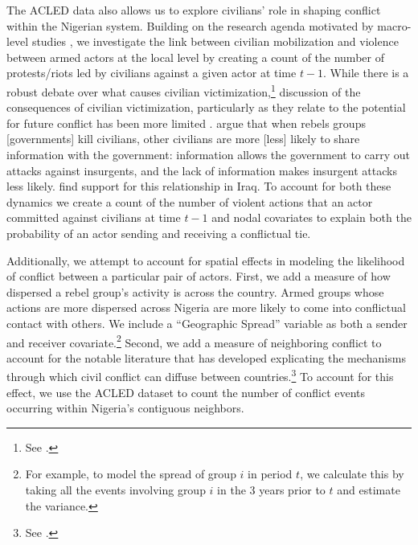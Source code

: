 The ACLED data also allows us to explore civilians' role in shaping conflict within the Nigerian system.  Building on the research agenda motivated by macro-level studies \citep{%
tarrow:1994, tucker:2007,chenoweth:stephan:2011}, we investigate the link between civilian mobilization and violence between armed actors at the local level by creating a count of the number of protests/riots led by civilians against a given actor at time $t-1$. While there is a robust debate over what causes civilian victimization,\footnote{See \citet{humphreys:weinstein:2006, downes:2006, kalyvas:2006, prorok:appel:2014}.} discussion of the consequences of civilian victimization, particularly as they relate to the potential for future conflict has been more limited \citep{hultman:2007, raleigh:2012}. \citet{berman:matanock:2015} argue that when rebels groups [governments] kill civilians, other civilians are more [less] likely to share information with the government: information allows the government to carry out attacks against insurgents, and the lack of information makes insurgent attacks less likely. \citet{condra:shapiro:2012} find support for this relationship in Iraq. To account for both these dynamics we create a count of the number of violent actions that an actor committed against civilians at time $t-1$ and nodal covariates to explain both the probability of an actor sending and receiving a conflictual tie. 

Additionally, we attempt to account for spatial effects in modeling the likelihood of conflict between a particular pair of actors. First, we add a measure of how dispersed a rebel group's activity is across the country. Armed groups whose actions are more dispersed across Nigeria are more likely to come into conflictual contact with others. We include a ``Geographic Spread'' variable as both a sender and receiver covariate.\footnote{For example, to model the spread of group $i$ in period $t$, we calculate this by taking all the events involving group $i$ in the 3 years prior to $t$ and estimate the variance.}  Second, we add a measure of neighboring conflict to account for the notable literature that has developed explicating the mechanisms through which civil conflict can diffuse between countries.\footnote{See \citet{salehyan:gleditsch:2007,metternich:etal:2015, braithwaite:2010a, beardsley:2011}.} To account for this effect, we use the ACLED dataset to count the number of conflict events occurring within Nigeria's contiguous neighbors. 

